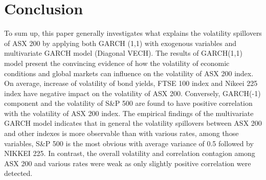 \documentclass[11pt]{article}
\begin{document}
\section{Conclusion}
To sum up, this paper generally investigates what explains the volatility spillovers of ASX 200 by applying both GARCH (1,1) with exogenous variables and multivariate GARCH model (Diagonal VECH). 
The results of GARCH(1,1) model present the convincing evidence of how the volatility of economic conditions and global markets can influence on the volatility of ASX 200 index. On average, increase of volatility of bond yields, FTSE 100 index and Nikeei 225 index have negative impact on the volatility of ASX 200. Conversely, GARCH(-1) component and the volatility of S\&P 500 are found to have positive correlation with the volatility of ASX 200 index.
The empirical findings of the multivariate GARCH model indicates that in general the volatility spillovers between ASX 200 and other indexes is more observable than with various rates, among those variables, S\&P 500 is the most obvious with average variance of 0.5 followed by NIKKEI 225. In contrast, the overall volatility and correlation contagion among ASX 200 and various rates were weak as only slightly positive correlation were detected. 


\newpage
\nocite{*}


	
\end{document}
